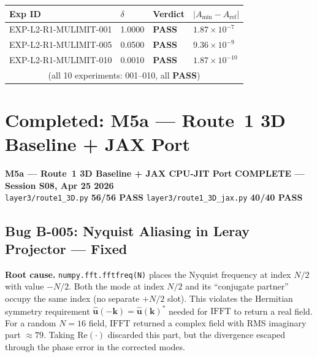 \documentclass[11pt, a4paper]{article}
\theoremstyle{definition}
\theoremstyle{remark}
\newenvironment{milestone}{%
  \begin{tcolorbox}[colback=tfblue!5, colframe=tfblue!50!black,
    breakable, left=4pt, right=4pt, top=4pt, bottom=4pt]
}{%
  \end{tcolorbox}
}
\newcommand{\PASS}{\textcolor{passgreen}{\textbf{PASS}}}
\begin{document}
\begin{center}
\begin{tabular}{llll}
\toprule
\textbf{Exp ID} & \textbf{$\delta$} & \textbf{Verdict} & \textbf{$|A_{\min} - A_{\mathrm{ref}}|$} \\
\midrule
EXP-L2-R1-MULIMIT-001 & 1.0000 & \PASS & $1.87\times10^{-7}$ \\
EXP-L2-R1-MULIMIT-005 & 0.0500 & \PASS & $9.36\times10^{-9}$ \\
EXP-L2-R1-MULIMIT-010 & 0.0010 & \PASS & $1.87\times10^{-10}$ \\
\multicolumn{4}{c}{\small (all 10 experiments: 001--010, all \PASS)} \\
\bottomrule
\end{tabular}
\end{center}

\section{Completed: M5a --- Route~1 3D Baseline + JAX Port}

\begin{milestone}
  \textbf{M5a --- Route~1 3D Baseline + JAX CPU-JIT Port}
  \hfill {\color{passgreen}\textbf{COMPLETE --- Session S08, Apr 25 2026}}\\[4pt]
  \texttt{layer3/route1\_3D.py} \textbf{56/56 PASS} \quad
  \texttt{layer3/route1\_3D\_jax.py} \textbf{40/40 PASS}
\end{milestone}

\subsection{Bug B-005: Nyquist Aliasing in Leray Projector --- Fixed}

\textbf{Root cause.}
\texttt{numpy.fft.fftfreq(N)} places the Nyquist frequency at index $N/2$ with
value $-N/2$. Both the mode at index $N/2$ and its ``conjugate partner'' occupy
the same index (no separate $+N/2$ slot). This violates the Hermitian symmetry
requirement $\hat{\mathbf{u}}(-\mathbf{k}) = \hat{\mathbf{u}}(\mathbf{k})^*$ needed
for $\mathrm{IFFT}$ to return a real field. For a random $N=16$ field,
$\mathrm{IFFT}$ returned a complex field with RMS imaginary part $\approx 79$.
Taking $\mathrm{Re}(\cdot)$ discarded this part, but the divergence escaped
through the phase error in the corrected modes.
\end{document}
